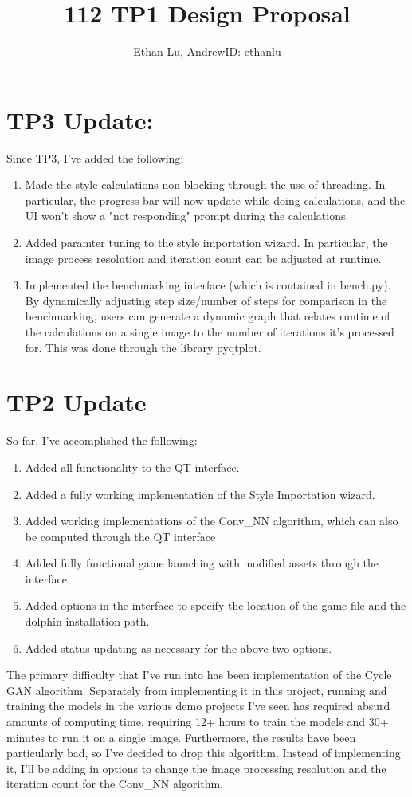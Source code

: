 \documentclass[12pt]{article}
\begin{document}
\title{112 TP1 Design Proposal}
\author{Ethan Lu, AndrewID: ethanlu}
\maketitle
\section{TP3 Update:}
Since TP3, I've added the following:
\begin{enumerate}
	\item Made the style calculations non-blocking through the use of threading. In particular, the progress bar will now update while doing calculations, and the UI won't show a "not responding" prompt during the calculations.
	\item Added paramter tuning to the style importation wizard. In particular, the image process resolution and iteration count can be adjusted at runtime.
	\item Implemented the benchmarking interface (which is contained in bench.py). By dynamically adjusting step size/number of steps for comparison in the benchmarking, users can generate a dynamic graph that relates runtime of the calculations on a single image to the number of iterations it's processed for. This was done through the library pyqtplot.
\end{enumerate}
\section{TP2 Update}
So far, I've accomplished the following:
\begin{enumerate}
	\item Added all functionality to the QT interface.
	\item Added a fully working implementation of the Style Importation wizard. 
	\item Added working implementations of the Conv\_NN algorithm, which can also be computed through the QT interface
	\item Added fully functional game launching with modified assets through the interface.
	\item Added options in the interface to specify the location of the game file and the dolphin installation path.
	\item Added status updating as necessary for the above two options.
\end{enumerate}
The primary difficulty that I've run into has been implementation of the Cycle GAN algorithm. 
Separately from implementing it in this project, running and training the models in the various demo projects I've seen has required absurd amounts of computing time, requiring 12+ hours to train the models and 30+ minutes to run it on a single image. Furthermore, the results have been particularly bad, so I've decided to drop this algorithm.
Instead of implementing it, I'll be adding in options to change the image processing resolution and the iteration count for the Conv\_NN algorithm.
\end{document}

